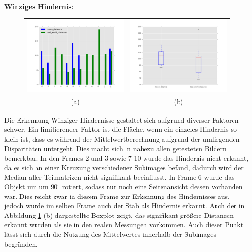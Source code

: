 	\noindent
	\textbf{Winziges Hindernis:}\\
	\begin{figure}[h]
		\centering
		\begin{tabular}{cc}
		\includegraphics[width=7cm]{img/evaluation/tiny_bar}&
		\includegraphics[width=7cm]{img/evaluation/tiny_box}\\
		(a)	& (b)
		\end{tabular}
	    \caption{}
	    \label{fig:eval_tiny}
	\end{figure}
	
	\noindent
	Die Erkennung Winziger Hindernisse gestaltet sich aufgrund diverser Faktoren schwer. Ein limitierender Faktor ist die Fläche, wenn ein einzeles Hindernis so klein ist, dass es während der Mittelwertberechnung aufgrund der umliegenden Disparitäten untergeht. Dies macht sich in nahezu allen getesteten Bildern bemerkbar. In den Frames 2 und 3 sowie 7-10 wurde das Hindernis nicht erkannt, da es sich an einer Kreuzung verschiedener Subimages befand, dadurch wird der Median aller Teilmatrizen nicht signifikant beeinflusst. In Frame 6 wurde das Objekt um um 90$^{\circ}$ rotiert, sodass nur noch eine Seitenansicht dessen vorhanden war. Dies reicht zwar in diesem Frame zur Erkennung des Hindernisses aus, jedoch wurde im selben Frame auch der Stab als Hindernis erkannt. Auch der in Abbildung \ref{fig:eval_tiny} (b) dargestellte Boxplot zeigt, das signifikant größere Distanzen erkannt wurden als sie in den realen Messungen vorkommen. Auch dieser Punkt lässt sich durch die Nutzung des Mittelwertes innerhalb der Subimages begründen.

